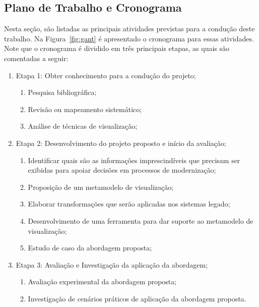 \documentclass[12pt]{article}
\begin{document}
\subsection{Plano de Trabalho e Cronograma}

Nesta seção, são listadas as principais atividades previstas para a condução deste trabalho. Na Figura~\ref{fig:gant} é apresentado o cronograma para essas atividades. Note que o cronograma é dividido em três principais etapas, as quais são comentadas a seguir:

\begin{enumerate}
\item Etapa 1: Obter conhecimento para a condução do projeto;
    
    \begin{enumerate}
    \item Pesquisa bibliográfica;
    \item Revisão ou mapeamento sistemático;
    \item Análise de técnicas de visualização;
    \end{enumerate}

\item Etapa 2: Desenvolvimento do projeto proposto e início da avaliação;

    \begin{enumerate}
    \item Identificar quais são as informações imprescindíveis que precisam ser exibidas para apoiar decisões em processos de modernização;
    \item Proposição de um metamodelo de visualização;
    \item Elaborar transformações que serão aplicadas nos sistemas legado;
    \item Desenvolvimento de uma ferramenta para dar suporte ao metamodelo de visualização;
    \item Estudo de caso da abordagem proposta;
    \end{enumerate}
    
\item Etapa 3: Avaliação e Investigação da aplicação da abordagem;

    \begin{enumerate}
    \item Avaliação experimental da abordagem proposta;
    \item Investigação de cenários práticos de aplicação da abordagem proposta.
    \end{enumerate}

\end{enumerate}
\end{document}
